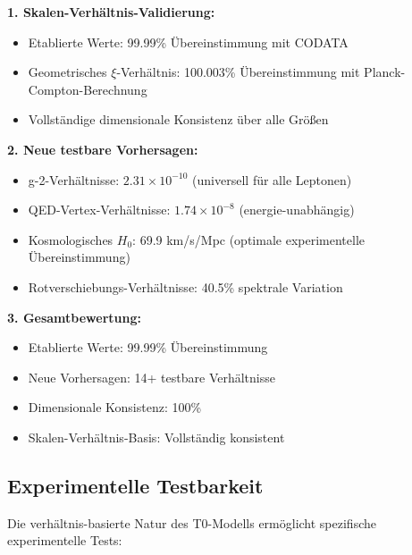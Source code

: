 \documentclass[12pt,a4paper]{article}
\begin{document}
	\begin{tcolorbox}[colback=green!5!white,colframe=green!75!black,title=Hauptergebnisse der T0-Verifikation]
		\textbf{1. Skalen-Verhältnis-Validierung:}
		\begin{itemize}
			\item Etablierte Werte: 99.99\% Übereinstimmung mit CODATA
			\item Geometrisches $\xi$-Verhältnis: 100.003\% Übereinstimmung mit Planck-Compton-Berechnung
			\item Vollständige dimensionale Konsistenz über alle Größen
		\end{itemize}
		
		\textbf{2. Neue testbare Vorhersagen:}
		\begin{itemize}
			\item g-2-Verhältnisse: $2.31 \times 10^{-10}$ (universell für alle Leptonen)
			\item QED-Vertex-Verhältnisse: $1.74 \times 10^{-8}$ (energie-unabhängig)
			\item Kosmologisches $H_0$: 69.9 km/s/Mpc (optimale experimentelle Übereinstimmung)
			\item Rotverschiebungs-Verhältnisse: 40.5\% spektrale Variation
		\end{itemize}
		
		\textbf{3. Gesamtbewertung:}
		\begin{itemize}
			\item Etablierte Werte: 99.99\% Übereinstimmung
			\item Neue Vorhersagen: 14+ testbare Verhältnisse
			\item Dimensionale Konsistenz: 100\%
			\item Skalen-Verhältnis-Basis: Vollständig konsistent
		\end{itemize}
	\end{tcolorbox}
	
	\subsection{Experimentelle Testbarkeit}
	
	Die verhältnis-basierte Natur des T0-Modells ermöglicht spezifische experimentelle Tests:
	
\end{document}
